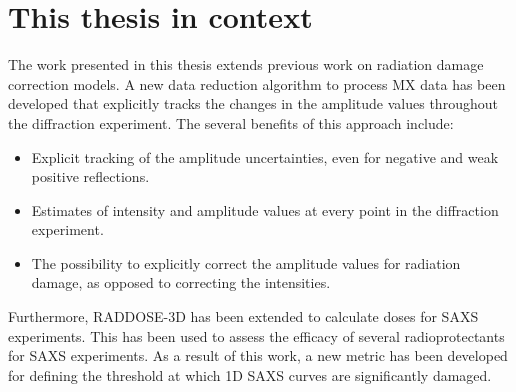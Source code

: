 \section{This thesis in context}
\label{sec:This thesis in context}
	The work presented in this thesis extends previous work on radiation damage correction models.
	A new data reduction algorithm to process MX data has been developed that explicitly tracks the changes in the amplitude values throughout the diffraction experiment.
	The several benefits of this approach include:
    \begin{itemize}
        \item Explicit tracking of the amplitude uncertainties, even for negative and weak positive reflections.
		\item Estimates of intensity and amplitude values at every point in the diffraction experiment.
		\item The possibility to explicitly correct the amplitude values for radiation damage, as opposed to correcting the intensities.
    \end{itemize}
	Furthermore, RADDOSE-3D has been extended to calculate doses for SAXS experiments.
	This has been used to assess the efficacy of several radioprotectants for SAXS experiments.
	As a result of this work, a new metric has been developed for defining the threshold at which 1D SAXS curves are significantly damaged.
